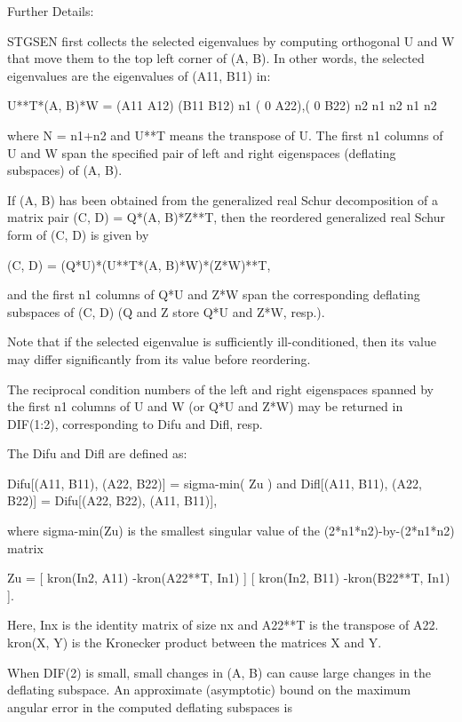 \begin{DoxyParagraph}{Further Details\+: }
\begin{DoxyVerb}  STGSEN first collects the selected eigenvalues by computing
  orthogonal U and W that move them to the top left corner of (A, B).
  In other words, the selected eigenvalues are the eigenvalues of
  (A11, B11) in:

              U**T*(A, B)*W = (A11 A12) (B11 B12) n1
                              ( 0  A22),( 0  B22) n2
                                n1  n2    n1  n2

  where N = n1+n2 and U**T means the transpose of U. The first n1 columns
  of U and W span the specified pair of left and right eigenspaces
  (deflating subspaces) of (A, B).

  If (A, B) has been obtained from the generalized real Schur
  decomposition of a matrix pair (C, D) = Q*(A, B)*Z**T, then the
  reordered generalized real Schur form of (C, D) is given by

           (C, D) = (Q*U)*(U**T*(A, B)*W)*(Z*W)**T,

  and the first n1 columns of Q*U and Z*W span the corresponding
  deflating subspaces of (C, D) (Q and Z store Q*U and Z*W, resp.).

  Note that if the selected eigenvalue is sufficiently ill-conditioned,
  then its value may differ significantly from its value before
  reordering.

  The reciprocal condition numbers of the left and right eigenspaces
  spanned by the first n1 columns of U and W (or Q*U and Z*W) may
  be returned in DIF(1:2), corresponding to Difu and Difl, resp.

  The Difu and Difl are defined as:

       Difu[(A11, B11), (A22, B22)] = sigma-min( Zu )
  and
       Difl[(A11, B11), (A22, B22)] = Difu[(A22, B22), (A11, B11)],

  where sigma-min(Zu) is the smallest singular value of the
  (2*n1*n2)-by-(2*n1*n2) matrix

       Zu = [ kron(In2, A11)  -kron(A22**T, In1) ]
            [ kron(In2, B11)  -kron(B22**T, In1) ].

  Here, Inx is the identity matrix of size nx and A22**T is the
  transpose of A22. kron(X, Y) is the Kronecker product between
  the matrices X and Y.

  When DIF(2) is small, small changes in (A, B) can cause large changes
  in the deflating subspace. An approximate (asymptotic) bound on the
  maximum angular error in the computed deflating subspaces is


\end{DoxyVerb}
\end{DoxyParagraph}
